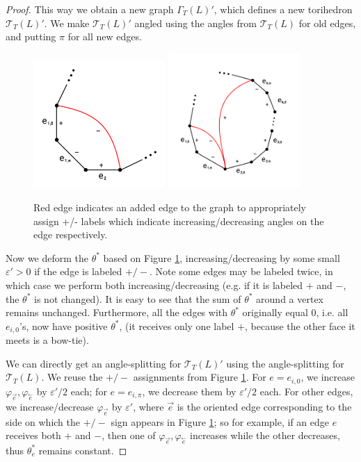 \documentclass[11pt]{amsart}
\newcommand{\sT}{{\mathcal{T}}}
\newcommand{\cev}[1]{\overset{\leftarrow}{#1}}
\newcommand{\vphi}{\varphi}
\newcommand{\veps}{\varepsilon}
\theoremstyle{plain}
\theoremstyle{definition}
\begin{document}
\begin{proof}
This way we obtain a new graph $\Gamma_T(L)'$, which defines a
new torihedron $\sT_T(L)'$.
We make $\sT_T(L)'$ angled using the angles from $\sT_T(L)$ for old edges,
and putting $\pi$ for all new edges.


\begin{figure}
\includegraphics[width=5cm]{more_pictures/one_edge.png}
\includegraphics[width=5cm]{more_pictures/two_edge_many.png}
\caption{Red edge indicates an added edge to the graph to appropriately assign +/- labels which indicate 
increasing/decreasing angles on the edge respectively.}
\label{f:adding_edges}
\end{figure}

Now we deform the $\theta^*$ based on Figure \ref{f:adding_edges},
increasing/decreasing by some small $\veps' > 0$ if the edge
is labeled $+/-$.
Note some edges may be labeled twice, in which case we perform
both increasing/decreasing (e.g. if it is labeled $+$ and $-$,
the $\theta^*$ is not changed).
It is easy to see that the sum of $\theta^*$ around a vertex
remains unchanged.
Furthermore, all the edges with $\theta^*$ originally equal 0,
i.e. all $e_{i,0}$'s,
now have positive $\theta^*$,
(it receives only one label $+$,
because the other face it meets is a bow-tie).



We can directly get an angle-splitting for $\sT_T(L)'$
using the angle-splitting for $\sT_T(L)$.
We reuse the $+/-$ assignments from Figure \ref{f:adding_edges}.
For $e = e_{i,0}$, we increase $\vphi_{\vec{e}}, \vphi_{\cev{e}}$
by $\veps'/2$ each; for $e = e_{i,\pi}$,
we decrease them by $\veps'/2$ each.
For other edges, we increase/decrease $\vphi_{\vec{e}}$ by $\veps'$,
where $\vec{e}$ is the oriented edge corresponding to the side
on which the $+/-$ sign appears in Figure \ref{f:adding_edges};
so for example, if an edge $e$ receives both $+$ and $-$,
then one of $\vphi_{\vec{e}},\vphi_{\cev{e}}$ increases
while the other decreases, thus $\theta_e^*$ remains constant.



\end{proof}
\end{document}
